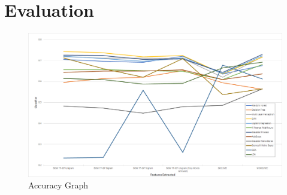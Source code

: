\chapter{Evaluation}

\begin{figure}[h!]
\centering
\includegraphics[width=1\textwidth]{evaluation/accuracy_graph.png}
\caption{\label{fig:accuracy} Accuracy Graph}
\end{figure}